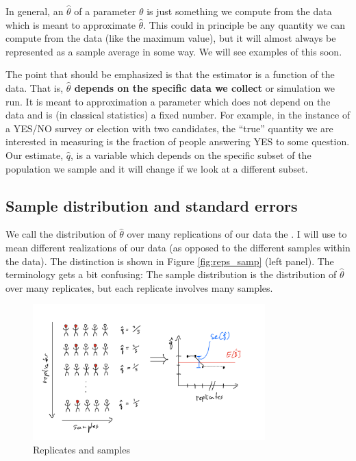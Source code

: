 In general, an  $\hat{\theta}$  of a parameter $\theta$ is just something we compute from the data which is meant to approximate $\hat{\theta}$. This could in principle be any quantity we can compute from the data (like the maximum value), but it will almost always be represented as a sample average in some way. We will see examples of this soon. 

The point that should be emphasized is that the estimator is a function of the data. That is, {\bf $\hat{\theta}$ depends on the specific data we collect} or simulation we run. It is meant to approximation a parameter which does not depend on the data and is (in classical statistics) a fixed number. For example,  in the instance of a YES/NO survey or election with two candidates, the ``true'' quantity we are interested in measuring is the fraction of people answering YES to some question. Our estimate, $\hat{q}$, is a variable which depends on the specific subset of the population we sample and it will change if we look at a different subset. 



\subsection{Sample distribution and standard errors}
 We call the distribution of $\hat{\theta}$ over many replications of our data the . I will use  to mean different realizations of our data (as opposed to the different samples within the data). The distinction is shown in Figure \ref{fig:reps_samp} (left panel). The terminology gets a bit confusing: The sample distribution is the distribution of $\hat{\theta}$ over many replicates, but each replicate involves many samples. 

\begin{figure}[h]
\centering
\includegraphics[width=0.8\textwidth]{./../figures/replicates}
\caption{Replicates and samples }\label{fig:rep_samp}
\end{figure}


